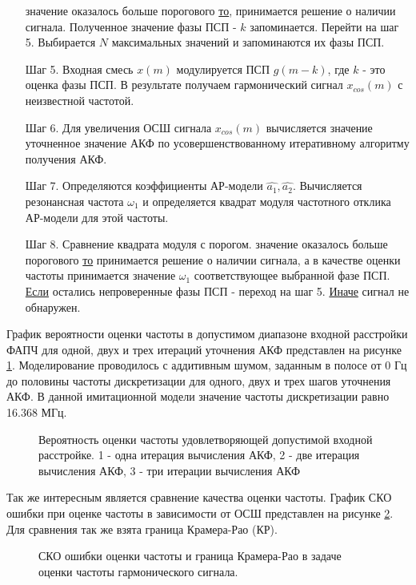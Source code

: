 \begin{itemize}
	  значение оказалось больше порогового {\underline{то}},
		принимается решение о наличии сигнала. Полученное значение фазы ПСП  - ${k}$ запоминается.
		Перейти на шаг 5.
		Выбирается ${N}$ максимальных значений и запоминаются их фазы ПСП.
\item[Шаг 5.] Входная смесь ${x(m)}$ модулируется ПСП ${g(m-k)}$, где ${k}$ - это оценка фазы ПСП. В результате получаем гармонический
	сигнал ${x_{cos}(m)}$ с неизвестной частотой.
\item[Шаг 6.] Для увеличения ОСШ сигнала ${x_{cos}(m)}$ вычисляется значение уточненное значение АКФ
	по усовершенствованному итеративному алгоритму получения АКФ.
\item[Шаг 7.] Определяются коэффициенты АР-модели ${\hat{a_1}, \hat{a_2}}$.
	Вычисляется резонансная частота ${\omega_1}$ и определяется квадрат модуля частотного отклика АР-модели для этой частоты. 
\item[Шаг 8.]
	Сравнение квадрата модуля с порогом.
          значение оказалось больше порогового {\underline{то}} 
                принимается решение о наличии сигнала, а в качестве оценки
                частоты принимается значение ${\omega_1}$ соответствующее выбранной фазе ПСП. 
		\subsubitem\underline{Если} остались непроверенные фазы ПСП - переход на шаг 5.
		\subsubitem\underline{Иначе} сигнал не обнаружен.
\end{itemize}

График вероятности оценки частоты в допустимом диапазоне входной расстройки ФАПЧ для одной, двух и трех итераций уточнения АКФ представлен на рисунке
\ref{pic:ar_dma_probability}. Моделирование проводилось с аддитивным шумом, заданным в полосе от 0 Гц до
половины частоты дискретизации для одного, двух и трех шагов уточнения АКФ. В данной имитационной модели значение частоты дискретизации равно 16.368 МГц.
\begin{figure}[h]
\center{}
	\caption{Вероятность оценки частоты удовлетворяющей допустимой входной расстройке. 1 - одна итерация вычисления АКФ, 2 - две итерация вычисления АКФ, 3 - три итерации вычисления АКФ}
	\label{pic:ar_dma_probability}
\end{figure}

Так же интересным является сравнение качества оценки частоты. График СКО ошибки при оценке частоты в зависимости
от ОСШ представлен на рисунке \ref{pic:crlb_vs_snr}. Для сравнения так же взята граница Крамера-Рао (КР).
\begin{figure}[h]
\center{}
	\caption{СКО ошибки оценки частоты и граница Крамера-Рао в задаче оценки частоты гармонического сигнала.}
	\label{pic:crlb_vs_snr}
\end{figure}

